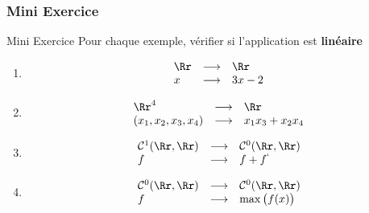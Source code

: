 \documentclass[dvipsnames]{beamer}
\begin{document}
\begin{frame}[t]
  \frametitle{Mini Exercice}
  \begin{block}{Mini Exercice}
    \small
    Pour chaque exemple, vérifier si l'application est
    \textbf{linéaire} 

    \begin{enumerate}
      \item
      \begin{equation}
        \begin{array}{lll}
          \Rr & \longrightarrow & \Rr\\
          x   & \longrightarrow & 3x - 2
        \end{array}
      \end{equation}

      \item
      \begin{equation}
        \begin{array}{lll}
          \Rr^4 & \longrightarrow & \Rr\\
          (x_1,x_2,x_3,x_4)   & \longrightarrow & x_1x_3 + x_2x_4
        \end{array}
      \end{equation}

      \item
      \begin{equation}
        \begin{array}{lll}
          \mathcal{C}^1(\Rr,\Rr) & \longrightarrow &
          \mathcal{C}^0(\Rr,\Rr)\\
          f   & \longrightarrow & f + f^{`}
        \end{array}
      \end{equation}

      \item
      \begin{equation}
        \begin{array}{lll}
          \mathcal{C}^0(\Rr,\Rr) & \longrightarrow &
          \mathcal{C}^0(\Rr,\Rr)\\
          f   & \longrightarrow & \max\big(f(x)\big)
        \end{array}
      \end{equation}
    \end{enumerate}

  \end{block}
  
\end{frame}
\end{document}

